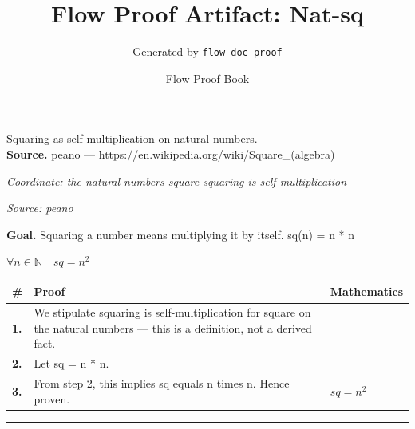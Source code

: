 \documentclass[11pt]{article}
\title{Flow Proof Artifact: Nat-sq}
\author{Generated by \texttt{flow doc proof}}
\date{Flow Proof Book}
\theoremstyle{definition}
\begin{document}
\maketitle
Squaring as self-multiplication on natural numbers.\\[0.5em]
\textbf{Source.} peano — https://en.wikipedia.org/wiki/Square\_(algebra)\\[0.5em]
\bigskip
{}\par
\smallskip\noindent\textit{Coordinate: the natural numbers \cdot square \cdot squaring is self-multiplication}\par
\smallskip\noindent\textit{Source: peano}\par
\medskip
\noindent\textbf{Goal.} Squaring a number means multiplying it by itself.  sq(n) = n * n\par
\noindent$\displaystyle \forall n \in \mathbb{N}\quad sq = n^{2}$\par
\medskip
\noindent
\begin{tabular}{@{} >{\raggedright\arraybackslash}p{} >{\raggedright\arraybackslash}p{} >{\raggedleft\arraybackslash}p{} @{}}
\textbf{\#} & \textbf{Proof} & \textbf{Mathematics} \\
\midrule
\textbf{1.} & We stipulate squaring is self-multiplication for square on the natural numbers — this is a definition, not a derived fact. & \\[0.45em]
\textbf{2.} & Let sq = n * n. & \\[0.45em]
\textbf{3.} & From step 2, this implies sq equals n times n. Hence proven. & $\displaystyle sq = n^{2}$ \\[0.45em]
\bottomrule
\end{tabular}
\label{thm:Nat-square-squaring_is_self_multiplication}
\par\medskip\hrule
\end{document}
